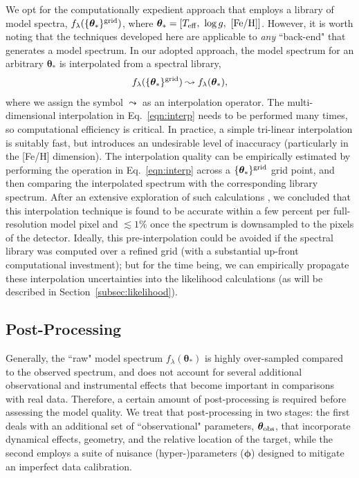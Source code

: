 \documentclass[iop,floatfix]{emulateapj}
\newcommand{\flam}{f_\lambda}
\newcommand{\vt}{ {\bm \theta}}
\newcommand{\vp}{ {\bm \phi}}
\begin{document}
We opt for the computationally expedient approach that employs a library of model spectra, 
$\flam(\{\vt_{\ast}\}^{\rm grid})$, where $\vt_{\ast} = [T_{\rm eff}, \,\, \log{g}, \,\, 
[{\rm Fe/H}]]$.  However, it is worth noting that the techniques developed here are applicable to 
{\it any} ``back-end" that generates a model spectrum.  In our adopted approach, the model 
spectrum for an arbitrary $\vt_{\ast}$ is interpolated from a spectral library, 
\begin{equation} \label{eqn:interp}
\flam(\{\vt_{\ast}\}^{\rm grid}) \leadsto \flam(\vt_{\ast}),
\end{equation}
where we assign the symbol $\leadsto$ as an interpolation operator.  The multi-dimensional 
interpolation in Eq.~\ref{eqn:interp} needs to be performed many times, so computational efficiency 
is critical.  In practice, a simple tri-linear interpolation is suitably fast, but introduces an 
undesirable level of inaccuracy (particularly in the [Fe/H] dimension).  The interpolation quality 
can be empirically estimated by performing the operation in Eq.~\ref{eqn:interp} across a 
$\{\vt_{\ast}\}^{\rm grid}$ grid point, and then comparing the interpolated spectrum with the 
corresponding library spectrum.  After an extensive exploration of such calculations 
\citep[see also][]{husser12}, we concluded that this interpolation
technique is found to be accurate within a few percent per full-resolution
model pixel and $\lesssim 1$\% once the spectrum is downsampled to the pixels of the detector. Ideally,
this pre-interpolation could be avoided if the spectral library was computed
over a refined grid (with a substantial up-front computational investment); but
for the time being, we can empirically propagate these interpolation
uncertainties into the likelihood calculations (as will be described in 
Section~\ref{subsec:likelihood}).  

\subsection{Post-Processing} \label{subsec:postprocess}

Generally, the ``raw" model spectrum $\flam(\vt_{\ast})$ is highly over-sampled compared to the 
observed spectrum, and does not account for several additional observational and 
instrumental effects that become important in comparisons with real data.  Therefore, a certain 
amount of post-processing is required before assessing the model quality.  We treat that 
post-processing in two stages: the first deals with an additional set of ``observational" 
parameters, $\vt_{\rm obs}$, that incorporate dynamical effects, geometry, and the relative 
location of the target, while the second employs a suite of nuisance (hyper-)parameters ($\vp$) 
designed to mitigate an imperfect data calibration.
\end{document}
